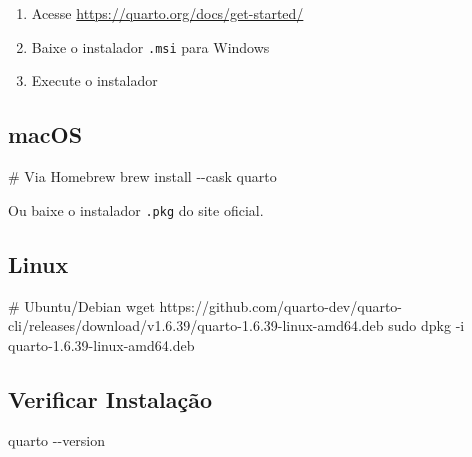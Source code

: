 \documentclass[
  letterpaper,
]{book}
\newenvironment{Shaded}{\begin{snugshade}}{\end{snugshade}}
\newcommand{\AttributeTok}[1]{\textcolor[rgb]{0.40,0.45,0.13}{#1}}
\newcommand{\CommentTok}[1]{\textcolor[rgb]{0.37,0.37,0.37}{#1}}
\newcommand{\ExtensionTok}[1]{\textcolor[rgb]{0.00,0.23,0.31}{#1}}
\newcommand{\FunctionTok}[1]{\textcolor[rgb]{0.28,0.35,0.67}{#1}}
\newcommand{\NormalTok}[1]{\textcolor[rgb]{0.00,0.23,0.31}{#1}}
\providecommand{\tightlist}{%
  \setlength{\itemsep}{0pt}\setlength{\parskip}{0pt}}\usepackage{longtable,booktabs,array}
\begin{document}
\begin{enumerate}
\def\labelenumi{\arabic{enumi}.}
\tightlist
\item
  Acesse \url{https://quarto.org/docs/get-started/}
\item
  Baixe o instalador \texttt{.msi} para Windows
\item
  Execute o instalador
\end{enumerate}

\subsection*{macOS}\label{macos-1}

\begin{Shaded}
\begin{Highlighting}[]
\CommentTok{\# Via Homebrew}
\ExtensionTok{brew}\NormalTok{ install }\AttributeTok{{-}{-}cask}\NormalTok{ quarto}
\end{Highlighting}
\end{Shaded}

Ou baixe o instalador \texttt{.pkg} do site oficial.

\subsection*{Linux}\label{linux}

\begin{Shaded}
\begin{Highlighting}[]
\CommentTok{\# Ubuntu/Debian}
\FunctionTok{wget}\NormalTok{ https://github.com/quarto{-}dev/quarto{-}cli/releases/download/v1.6.39/quarto{-}1.6.39{-}linux{-}amd64.deb}
\FunctionTok{sudo}\NormalTok{ dpkg }\AttributeTok{{-}i}\NormalTok{ quarto{-}1.6.39{-}linux{-}amd64.deb}
\end{Highlighting}
\end{Shaded}

\subsection*{Verificar Instalação}\label{verificar-instalauxe7uxe3o-1}

\begin{Shaded}
\begin{Highlighting}[]
\ExtensionTok{quarto} \AttributeTok{{-}{-}version}
\end{Highlighting}
\end{Shaded}
\end{document}
